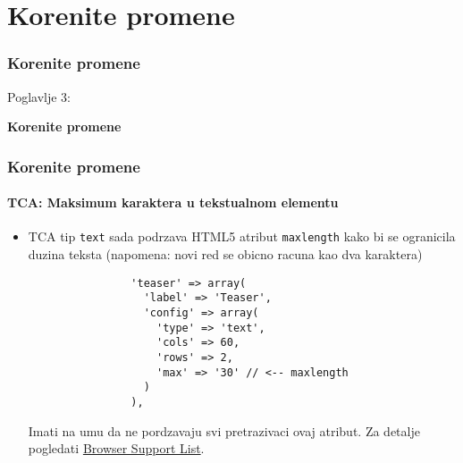 %

\section{Korenite promene}
\begin{frame}[fragile]
	\frametitle{Korenite promene}

	\begin{center}\huge{Poglavlje 3:}\end{center}
	\begin{center}\huge{\color{typo3darkgrey}\textbf{Korenite promene}}\end{center}

\end{frame}


\begin{frame}[fragile]
	\frametitle{Korenite promene}
	\framesubtitle{TCA: Maksimum karaktera u tekstualnom elementu}

	\begin{itemize}
		\item TCA tip \texttt{text} sada podrzava HTML5 atribut \texttt{maxlength}
			 kako bi se ogranicila duzina teksta (napomena: novi red se obicno racuna kao dva karaktera)

			\begin{lstlisting}
				'teaser' => array(
				  'label' => 'Teaser',
				  'config' => array(
				    'type' => 'text',
				    'cols' => 60,
				    'rows' => 2,
				    'max' => '30' // <-- maxlength
				  )
				),
			\end{lstlisting}

			Imati na umu da ne pordzavaju svi pretrazivaci ovaj atribut.\newline
			Za detalje pogledati \href{http://www.w3schools.com/tags/att_textarea_maxlength.asp}{Browser Support List}.

	\end{itemize}

\end{frame}

